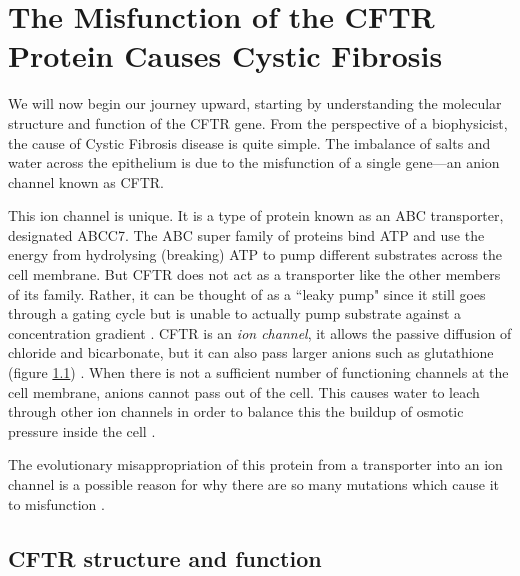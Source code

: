 \section{The Misfunction of the CFTR Protein Causes Cystic Fibrosis}

We will now begin our journey upward, starting by understanding the molecular structure and function of the CFTR gene. From the perspective of a biophysicist, the cause of Cystic Fibrosis disease is quite simple. The imbalance of salts and water across the epithelium is due to the misfunction of a single gene---an anion channel known as CFTR.

This ion channel is unique. It is a type of protein known as an ABC transporter, designated ABCC7. The ABC super family of proteins bind ATP and use the energy from hydrolysing (breaking) ATP to pump different substrates across the cell membrane. But CFTR does not act as a transporter like the other members of its family. Rather, it can be thought of as a ``leaky pump" since it still goes through a gating cycle but is unable to actually pump substrate against a concentration gradient \cite{gadsby2006,linsdell2018}. CFTR is an \textit {ion channel}, it allows the passive diffusion of chloride and bicarbonate, but it can also pass larger anions such as glutathione (figure \ref{}) \cite{gadsby2006, tang2009,linsdell1998}. When there is not a sufficient number of functioning channels at the cell membrane, anions cannot pass out of the cell. This causes water to leach through other ion channels in order to balance this the buildup of osmotic pressure inside the cell \cite{verkman2003}. 

The evolutionary misappropriation of this protein from a transporter into an ion channel is a possible reason for why there are so many mutations which cause it to misfunction \cite{infield2021}.

\subsection{CFTR structure and function}

